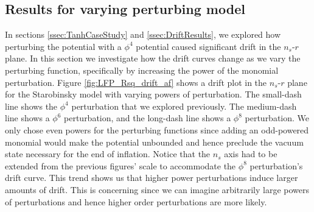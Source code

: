 \documentclass[a4paper,11pt]{article}
\def\nsr{$n_s$-$r$ }
\begin{document}


\FloatBarrier
\subsection{Results for varying perturbing model}
\label{ssec:DriftVaryAf}

In sections \ref{ssec:TanhCaseStudy} and \ref{ssec:DriftResults}, we explored how perturbing the potential with a $\phi^4$ potential caused significant drift in the \nsr plane. In this section we investigate how the drift curves change as we vary the perturbing function, specifically by increasing the power of the monomial perturbation. Figure \ref{fig:LFP_Rsq_drift_af} shows a drift plot in the \nsr plane for the Starobinsky model with varying powers of perturbation. The small-dash line shows the $\phi^4$ perturbation that we explored previously. The medium-dash line shows a $\phi^6$ perturbation, and the long-dash line shows a $\phi^8$ perturbation. We only chose even powers for the perturbing functions since adding an odd-powered monomial  would make the potential unbounded and hence preclude the vacuum state necessary for the end of inflation. Notice that the $n_s$ axis had to be extended from the previous figures' scale to accommodate the $\phi^8$ perturbation's drift curve. This trend shows us that higher power perturbations induce larger amounts of drift. This is concerning since we can imagine arbitrarily large powers of perturbations and hence higher order perturbations are more likely. 
\end{document}
